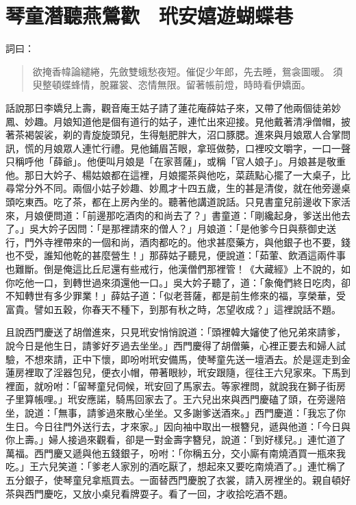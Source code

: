 
\chapter{琴童潛聽燕鶯歡　玳安嬉遊蝴蝶巷}

詞曰：
\begin{quote}
欲掩香幃論繾綣，先斂雙蛾愁夜短。催促少年郎，先去睡，鴛衾圖暖。
須臾整頓蝶蜂情，脫羅裳、恣情無限。留著帳前燈，時時看伊嬌面。
\end{quote}

話說那日李嬌兒上壽，觀音庵王姑子請了蓮花庵薛姑子來，又帶了他兩個徒弟妙鳳、妙趣。月娘知道他是個有道行的姑子，連忙出來迎接。見他戴著清凈僧帽，披著茶褐袈裟，剃的青旋旋頭兒，生得魁肥胖大，沼口豚腮。進來與月娘眾人合掌問訊，慌的月娘眾人連忙行禮。見他鋪眉苫眼，拿班做勢，口裡咬文嚼字，一口一聲只稱呼他「薛爺」。他便叫月娘是「在家菩薩」，或稱「官人娘子」。月娘甚是敬重他。那日大妗子、楊姑娘都在這裡，月娘擺茶與他吃，菜蔬點心擺了一大桌子，比尋常分外不同。兩個小姑子妙趣、妙鳳才十四五歲，生的甚是清俊，就在他旁邊桌頭吃東西。吃了茶，都在上房內坐的。聽著他講道說話。只見書童兒前邊收下家活來，月娘便問道：「前邊那吃酒肉的和尚去了？」書童道：「剛纔起身，爹送出他去了。」吳大妗子因問：「是那裡請來的僧人？」月娘道：「是他爹今日與蔡御史送行，門外寺裡帶來的一個和尚，酒肉都吃的。他求甚麼藥方，與他銀子也不要，錢也不受，誰知他乾的甚麼營生！」那薛姑子聽見，便說道：「茹葷、飲酒這兩件事也難斷。倒是俺這比丘尼還有些戒行，他漢僧們那裡管！《大藏經》上不說的，如你吃他一口，到轉世過來須還他一口。」吳大妗子聽了，道：「象俺們終日吃肉，卻不知轉世有多少罪業！」薛姑子道：「似老菩薩，都是前生修來的福，享榮華，受富貴。譬如五穀，你春天不種下，到那有秋之時，怎望收成？」這裡說話不題。

且說西門慶送了胡僧進來，只見玳安悄悄說道：「頭裡韓大嬸使了他兄弟來請爹，說今日是他生日，請爹好歹過去坐坐。」西門慶得了胡僧藥，心裡正要去和婦人試驗，不想來請，正中下懷，即吩咐玳安備馬，使琴童先送一壇酒去。於是逕走到金蓮房裡取了淫器包兒，便衣小帽，帶著眼紗，玳安跟隨，徑往王六兒家來。下馬到裡面，就吩咐：「留琴童兒伺候，玳安回了馬家去。等家裡問，就說我在獅子街房子里算帳哩。」玳安應諾，騎馬回家去了。王六兒出來與西門慶磕了頭，在旁邊陪坐，說道：「無事，請爹過來散心坐坐。又多謝爹送酒來。」西門慶道：「我忘了你生日。今日往門外送行去，才來家。」因向袖中取出一根簪兒，遞與他道：「今日與你上壽。」婦人接過來觀看，卻是一對金壽字簪兒，說道：「到好樣兒。」連忙道了萬福。西門慶又遞與他五錢銀子，吩咐：「你稱五分，交小廝有南燒酒買一瓶來我吃。」王六兒笑道：「爹老人家別的酒吃厭了，想起來又要吃南燒酒了。」連忙稱了五分銀子，使琴童兒拿瓶買去。一面替西門慶脫了衣裳，請入房裡坐的。親自頓好茶與西門慶吃，又放小桌兒看牌耍子。看了一回，才收拾吃酒不題。

